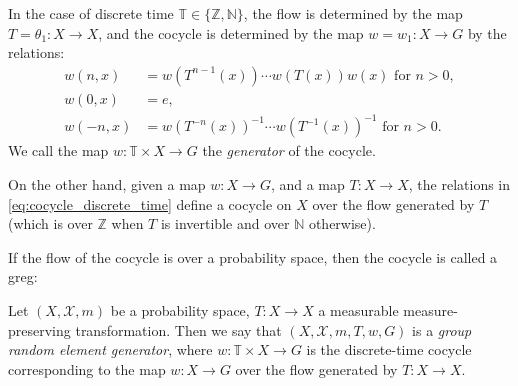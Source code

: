 \documentclass{report}
\begin{document}
\begin{remark}
    In the case of discrete time $\mathbb T \in \{\mathbb Z, \mathbb N\}$, the flow is determined by the map $T = \theta_1: X \to X$, and the cocycle is determined by the map $w = w_1: X \to G$ by the relations:
    \begin{equation}\label{eq:cocycle_discrete_time}
        \begin{aligned}
            w(n, x) &= w(T^{n-1}(x)) \cdots w(T(x)) w(x) \text{ for } n > 0, \\
            w(0, x) &= e, \\
            w(-n, x) &= w(T^{-n}(x))^{-1} \cdots w(T^{-1}(x))^{-1} \text{ for } n > 0.
        \end{aligned}
    \end{equation}
    We call the map $w: \mathbb T \times X \to G$ the \emph{generator} of the cocycle.

    On the other hand, given a map $w: X \to G$, and a map $T: X \to X$, the relations in \cref{eq:cocycle_discrete_time} define a cocycle on $X$ over the flow generated by $T$ (which is over $\mathbb Z$ when $T$ is invertible and over $\mathbb N$ otherwise).
\end{remark}
If the flow of the cocycle is over a probability space, then the cocycle is called a greg:
\begin{definition}
    Let $(X, \mathcal X, m)$ be a probability space, $T: X \to X$ a measurable measure-preserving transformation.
    Then we say that $(X, \mathcal X, m, T, w, G)$ is a \emph{group random element generator}, where $w: \mathbb T \times X \to G$ is the discrete-time cocycle corresponding to the map $w: X \to G$ over the flow generated by $T: X \to X$.
\end{definition}
\end{document}
